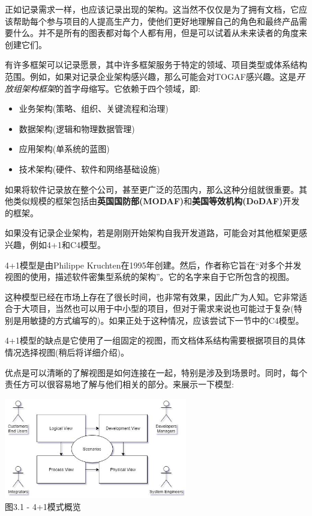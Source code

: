 
正如记录需求一样，也应该记录出现的架构。这当然不仅仅是为了拥有文档，它应该帮助每个参与项目的人提高生产力，使他们更好地理解自己的角色和最终产品需要什么。并不是所有的图表都对每个人都有用，但是可以试着从未来读者的角度来创建它们。

有许多框架可以记录愿景，其中许多框架服务于特定的领域、项目类型或体系结构范围。例如，如果对记录企业架构感兴趣，那么可能会对TOGAF感兴趣。这是\textit{开放组架构框架}的首字母缩写。它依赖于四个领域，即:

\begin{itemize}
\item 
业务架构(策略、组织、关键流程和治理)

\item 
数据架构(逻辑和物理数据管理)

\item 
应用架构(单系统的蓝图)

\item
技术架构(硬件、软件和网络基础设施)
\end{itemize}

如果将软件记录放在整个公司，甚至更广泛的范围内，那么这种分组就很重要。其他类似规模的框架包括由\textbf{英国国防部(MODAF)}和\textbf{美国等效机构(DoDAF)}开发的框架。

如果没有记录企业架构，若是刚刚开始架构自我开发道路，可能会对其他框架更感兴趣，例如4+1和C4模型。


4+1模型是由Philippe Kruchten在1995年创建。然后，作者称它旨在“对多个并发视图的使用，描述软件密集型系统的架构”。它的名字来自于它所包含的视图。

这种模型已经在市场上存在了很长时间，也非常有效果，因此广为人知。它非常适合于大项目，当然也可以用于中小型的项目，但对于需求来说也可能过于复杂(特别是用敏捷的方式编写的)。如果正处于这种情况，应该尝试下一节中的C4模型。

4+1模型的缺点是它使用了一组固定的视图，而文档体系结构需要根据项目的具体情况选择视图(稍后将详细介绍)。

优点是可以清晰的了解视图是如何连接在一起，特别是涉及到场景时。同时，每个责任方可以很容易地了解与他们相关的部分。来展示一下模型:

\begin{center}
\includegraphics[width=0.6\textwidth]{content/1/chapter3/images/1.jpg}\\
图3.1 - 4+1模式概览
\end{center}

